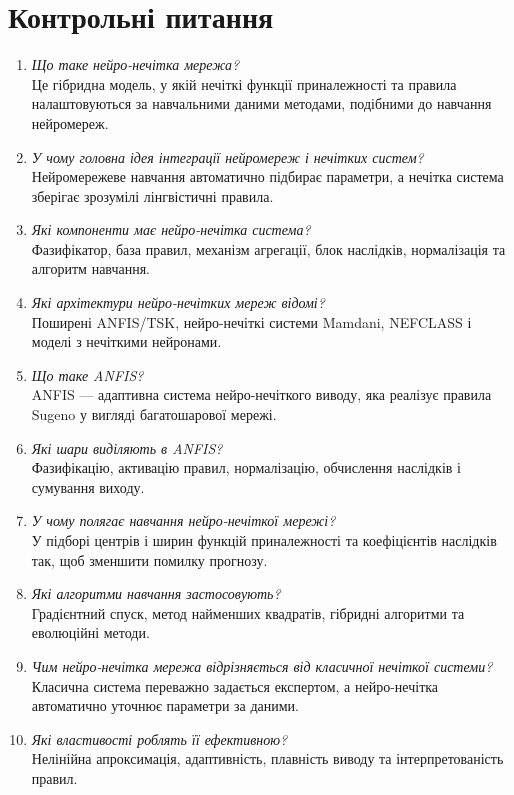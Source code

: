 \documentclass[12pt,a4paper]{article}
\begin{document}
\section{Контрольні питання}
\begin{enumerate}[leftmargin=*]
\item \textit{Що таке нейро-нечітка мережа?}\\
Це гібридна модель, у якій нечіткі функції приналежності та правила налаштовуються за навчальними даними методами, подібними до навчання нейромереж.
\item \textit{У чому головна ідея інтеграції нейромереж і нечітких систем?}\\
Нейромережеве навчання автоматично підбирає параметри, а нечітка система зберігає зрозумілі лінгвістичні правила.
\item \textit{Які компоненти має нейро-нечітка система?}\\
Фазифікатор, база правил, механізм агрегації, блок наслідків, нормалізація та алгоритм навчання.
\item \textit{Які архітектури нейро-нечітких мереж відомі?}\\
Поширені ANFIS/TSK, нейро-нечіткі системи Mamdani, NEFCLASS і моделі з нечіткими нейронами.
\item \textit{Що таке ANFIS?}\\
ANFIS --- адаптивна система нейро-нечіткого виводу, яка реалізує правила Sugeno у вигляді багатошарової мережі.
\item \textit{Які шари виділяють в ANFIS?}\\
Фазифікацію, активацію правил, нормалізацію, обчислення наслідків і сумування виходу.
\item \textit{У чому полягає навчання нейро-нечіткої мережі?}\\
У підборі центрів і ширин функцій приналежності та коефіцієнтів наслідків так, щоб зменшити помилку прогнозу.
\item \textit{Які алгоритми навчання застосовують?}\\
Градієнтний спуск, метод найменших квадратів, гібридні алгоритми та еволюційні методи.
\item \textit{Чим нейро-нечітка мережа відрізняється від класичної нечіткої системи?}\\
Класична система переважно задається експертом, а нейро-нечітка автоматично уточнює параметри за даними.
\item \textit{Які властивості роблять її ефективною?}\\
Нелінійна апроксимація, адаптивність, плавність виводу та інтерпретованість правил.

\end{enumerate}
\end{document}
